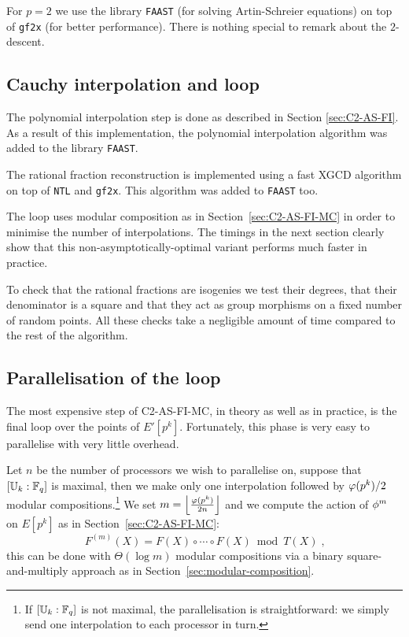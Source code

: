 For $p=2$ we use the library \texttt{FAAST} (for solving
Artin-Schreier equations) on top of \texttt{gf2x} (for better
performance). There is nothing special to remark about the
$2$-descent.


\subsection{Cauchy interpolation and loop}
\label{sec:impl:cauchy}
The polynomial interpolation step is done as described in Section
\ref{sec:C2-AS-FI}. As a result of this implementation, the polynomial
interpolation algorithm was added to the library \texttt{FAAST}.

The rational fraction reconstruction is implemented using a fast XGCD
algorithm on top of \texttt{NTL} and \texttt{gf2x}. This algorithm was
added to \texttt{FAAST} too.

The loop uses modular composition as in Section~\ref{sec:C2-AS-FI-MC}
in order to minimise the number of interpolations. The timings in the
next section clearly show that this non-asymptotically-optimal variant
performs much faster in practice.

To check that the rational fractions are isogenies we test their
degrees, that their denominator is a square and that they act as group
morphisms on a fixed number of random points. All these checks take a
negligible amount of time compared to the rest of the algorithm.


\subsection{Parallelisation of the loop}
\label{parallel}

The most expensive step of C2-AS-FI-MC, in theory as well as in
practice, is the final loop over the points of $E'[p^k]$. Fortunately,
this phase is very easy to parallelise with very little overhead.

Let $n$ be the number of processors we wish to parallelise on, suppose
that $[\mathbb{U}_k:\mathbb{F}_q]$ is maximal, then we make only one interpolation
followed by $\varphi(p^k)/2$ modular compositions.\footnote{If
  $[\mathbb{U}_k:\mathbb{F}_q]$ is not maximal, the parallelisation is
  straightforward: we simply send one interpolation to each processor
  in turn.} We set $m=\left\lfloor\frac{\varphi(p^k)}{2n}\right\rfloor$
and we compute the action of $\phi^{m}$ on $E[p^k]$ as in
Section~\ref{sec:C2-AS-FI-MC}:
\begin{equation*}
  F^{(m)}(X) = F(X) \circ \cdots \circ F(X) \bmod T(X)
  \;\text{,}
\end{equation*}
this can be done with $\Theta(\log m)$ modular compositions via a
binary square-and-multiply approach as in
Section~\ref{sec:modular-composition}.

